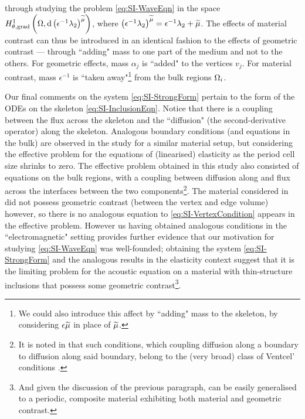 through studying the problem \eqref{eq:SI-WaveEqn} in the space $H^1_{\theta, \mathrm{grad}}\left( \Omega, \mathrm{d}\left( \epsilon^{-1}\lambda_2 \right)^{\widetilde{\mu}} \right)$, where $\left( \epsilon^{-1}\lambda_2 \right)^{\widetilde{\mu}} = \epsilon^{-1}\lambda_2 + \widetilde{\mu}$.
The effects of material contrast can thus be introduced in an identical fashion to the effects of geometric contrast --- through ``adding" mass to one part of the medium and not to the others.
For geometric effects, mass $\alpha_j$ is ``added" to the vertices $v_j$.
For material contrast, mass $\epsilon^{-1}$ is ``taken away"\footnote{We could also introduce this affect by ``adding" mass to the skeleton, by considering $\epsilon\widetilde{\mu}$ in place of $\widetilde{\mu}$.} from the bulk regions $\Omega_i$. 

Our final comments on the system \eqref{eq:SI-StrongForm} pertain to the form of the ODEs on the skeleton \eqref{eq:SI-InclusionEqn}.
Notice that there is a coupling between the flux across the skeleton and the ``diffusion" (the second-derivative operator) along the skeleton.
Analogous boundary conditions (and equations in the bulk) are observed in the study \cite{cherednichenko2019homogenisation} for a similar material setup, but considering the effective problem for the equations of (linearised) elasticity as the period cell size shrinks to zero.
The effective problem obtained in this study also consisted of equations on the bulk regions, with a coupling between diffusion along and flux across the interfaces between the two components\footnote{It is noted in \cite{cherednichenko2019homogenisation} that such conditions, which coupling diffusion along a boundary to diffusion along said boundary, belong to the (very broad) class of Ventcel' conditions \cite{venttsel1959boundary}.}.
The material considered in \cite{cherednichenko2019homogenisation} did not possess geometric contrast (between the vertex and edge volume) however, so there is no analogous equation to \eqref{eq:SI-VertexCondition} appears in the effective problem.
However us having obtained analogous conditions in the ``electromagnetic" setting provides further evidence that our motivation for studying \eqref{eq:SI-WaveEqn} was well-founded; obtaining the system \eqref{eq:SI-StrongForm} and the analogous results in the elasticity context suggest that it is the limiting problem for the acoustic equation on a material with thin-structure inclusions that possess some geometric contrast\footnote{And given the discussion of the previous paragraph, can be easily generalised to a periodic, composite material exhibiting both material and geometric contrast.}.


